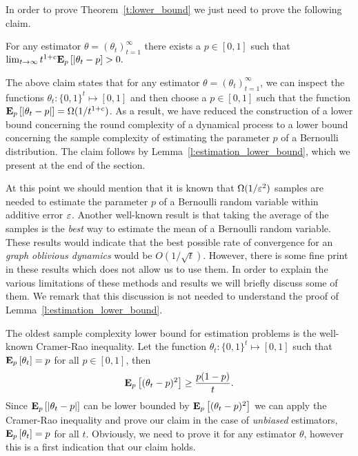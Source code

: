 %
In order to prove Theorem~\ref{t:lower_bound} we
just need to prove the following claim.
\begin{claim}\label{cl:fixed_p}
  For any estimator $\theta = (\theta_t)_{t=1}^\infty$
  there exists a $p \in [0,1]$ such that
  \(
    \lim_{t \to \infty} t^{1+c} \bm{\mathrm{E}}_{p} \left[ |\theta_t - p \right] > 0.
  \)
\end{claim}
The above claim states that for any estimator $\theta=(\theta_t)_{t=1}^\infty$,
we can inspect the functions $\theta_t: \{0,1\}^t \mapsto [0,1]$ and then choose
a $p \in [0,1]$ such that the function $\bm{\mathrm{E}}_{p} \left[ |\theta_t-p| \right]= \Omega(1/t^{1+c})$. As
a result, we have reduced the construction of a lower bound concerning the round
complexity of a dynamical process to a lower bound concerning the sample complexity of
estimating the parameter $p$ of a Bernoulli distribution. The claim follows by
Lemma~\ref{l:estimation_lower_bound}, which we present at the end of the section.

At this point we should mention that it is known
that $\Omega(1/\varepsilon^2)$ samples are needed to estimate the parameter $p$
of a Bernoulli random variable within additive error $\varepsilon$.
Another well-known result is that taking the average of the samples
is the \emph{best} way to estimate the mean of a Bernoulli random variable.
These results would indicate that the best possible rate of convergence
for an \emph{graph oblivious dynamics} would be $O(1/\sqrt{t})$.
However, there is some fine print in these results which does not allow us
to use them. In order to explain the various limitations of
these methods and results we will briefly discuss some of them.
We remark that this discussion is not needed to understand the proof of
Lemma~\ref{l:estimation_lower_bound}.

The oldest sample complexity lower bound for estimation problems
is the well-known Cramer-Rao inequality.
Let the function $\theta_t: \{0,1\}^t \mapsto [0,1]$ such
that $\bm{\mathrm{E}}_{p} \left[ \theta_t \right]=p$ for all $p \in [0,1]$, then
\begin{equation}\label{eq:crlb}
  \bm{\mathrm{E}}_{p} \left[ (\theta_t - p)^2 \right] \geq \frac{p(1-p)}{t}.
\end{equation}
Since $\bm{\mathrm{E}}_{p} \left[ |\theta_t - p| \right]$ can be lower bounded
by $\bm{\mathrm{E}}_{p} \left[ (\theta_t - p)^2 \right]$ we can apply the Cramer-Rao inequality and
prove our claim in the case of \emph{unbiased} estimators, $\bm{\mathrm{E}}_{p} \left[ \theta_t \right]=p$
for all $t$. Obviously, we need to prove it for any estimator $\theta$, however
this is a first indication that our claim holds.

